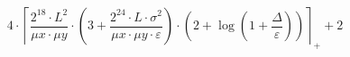 \[4 \cdot \left\lceil \frac{2^{18} \cdot L^{2}}{\mu x \cdot \mu y} \cdot \left(3 + \frac{2^{24} \cdot L \cdot \sigma^{2}}{\mu x \cdot \mu y \cdot \varepsilon}\right) \cdot \left(2 + \log\left(1 + \frac{\Delta}{\varepsilon}\right)\right) \right\rceil_{+} + 2\]
